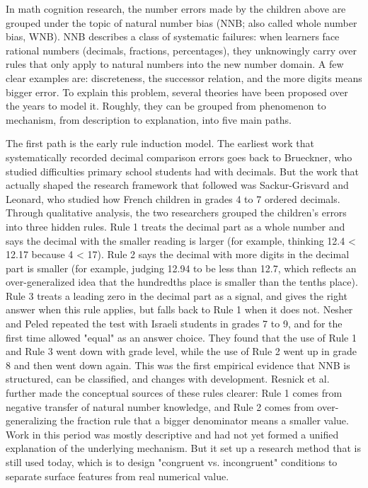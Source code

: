 In math cognition research, the number errors made by the children above are grouped under the topic of natural number bias (NNB; also called whole number bias, WNB)\cite{alibali2015, alonsodaz2018}. NNB describes a class of systematic failures: when learners face rational numbers (decimals, fractions, percentages), they unknowingly carry over rules that only apply to natural numbers into the new number domain. A few clear examples are: discreteness, the successor relation, and the more digits means bigger error. To explain this problem, several theories have been proposed over the years to model it. Roughly, they can be grouped from phenomenon to mechanism, from description to explanation, into five main paths.

The first path is the early rule induction model. The earliest work that systematically recorded decimal comparison errors goes back to Brueckner\cite{brueckner1928}, who studied difficulties primary school students had with decimals. But the work that actually shaped the research framework that followed was Sackur-Grisvard and Leonard\cite{sackurgrisvard1985}, who studied how French children in grades 4 to 7 ordered decimals. Through qualitative analysis, the two researchers grouped the children's errors into three hidden rules. Rule 1 treats the decimal part as a whole number and says the decimal with the smaller reading is larger (for example, thinking 12.4 < 12.17 because 4 < 17). Rule 2 says the decimal with more digits in the decimal part is smaller (for example, judging 12.94 to be less than 12.7, which reflects an over-generalized idea that the hundredths place is smaller than the tenths place). Rule 3 treats a leading zero in the decimal part as a signal, and gives the right answer when this rule applies, but falls back to Rule 1 when it does not. Nesher and Peled\cite{nesher1986} repeated the test with Israeli students in grades 7 to 9, and for the first time allowed "equal" as an answer choice. They found that the use of Rule 1 and Rule 3 went down with grade level, while the use of Rule 2 went up in grade 8 and then went down again. This was the first empirical evidence that NNB is structured, can be classified, and changes with development. Resnick et al.\cite{resnick1989} further made the conceptual sources of these rules clearer: Rule 1 comes from negative transfer of natural number knowledge, and Rule 2 comes from over-generalizing the fraction rule that a bigger denominator means a smaller value. Work in this period was mostly descriptive and had not yet formed a unified explanation of the underlying mechanism. But it set up a research method that is still used today, which is to design "congruent vs. incongruent" conditions to separate surface features from real numerical value.

